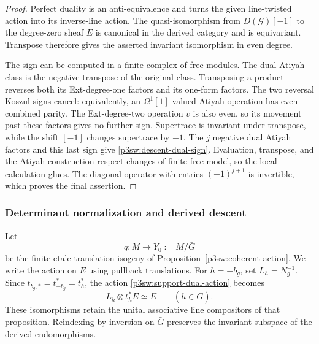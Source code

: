 \documentclass[11pt]{article}
\numberwithin{equation}{section}
\begin{document}
\begin{proof}
Perfect duality is an anti-equivalence and turns the given line-twisted
action into its inverse-line action.  The quasi-isomorphism from
\(D(\mathcal G)[-1]\) to the degree-zero sheaf \(E\) is canonical in the
derived category and is equivariant.  Transpose therefore gives the
asserted invariant isomorphism in even degree.

The sign can be computed in a finite complex of free modules.  The dual
Atiyah class is the negative transpose of the original class.
Transposing a product reverses both its Ext-degree-one factors and its
one-form factors.  The two reversal Koszul signs cancel: equivalently,
an \(\Omega^1[1]\)-valued Atiyah operation has even combined parity.
The Ext-degree-two operation \(v\) is also even, so its movement past
these factors gives no further sign.  Supertrace is invariant under
transpose, while the shift \([-1]\) changes supertrace by \(-1\).
The \(j\) negative dual Atiyah factors and this last sign give
\eqref{p3sw:descent-dual-sign}.  Evaluation, transpose, and the
Atiyah construction respect changes of finite free model, so the local
calculation glues.  The diagonal operator with entries
\((-1)^{j+1}\) is invertible, which proves the final assertion.
\end{proof}

\subsubsection{Determinant normalization and derived descent}

Let
\[
 q:M\longrightarrow Y_0:=M/\bar G
\]
be the finite etale translation isogeny of
Proposition~\ref{p3sw:coherent-action}.  We write the action on \(E\)
using pullback translations.  For \(h=-b_g\), set \(L_h=N_g^{-1}\).
Since \(t_{b_g,*}=t_{-b_g}^*=t_h^*\), the action
\eqref{p3sw:support-dual-action} becomes
\[
 L_h\otimes t_h^*E\simeq E\qquad(h\in\bar G).
\]
These isomorphisms retain the unital associative line compositors of
that proposition.  Reindexing by inversion on \(\bar G\) preserves the
invariant subspace of the derived endomorphisms.
\end{document}
